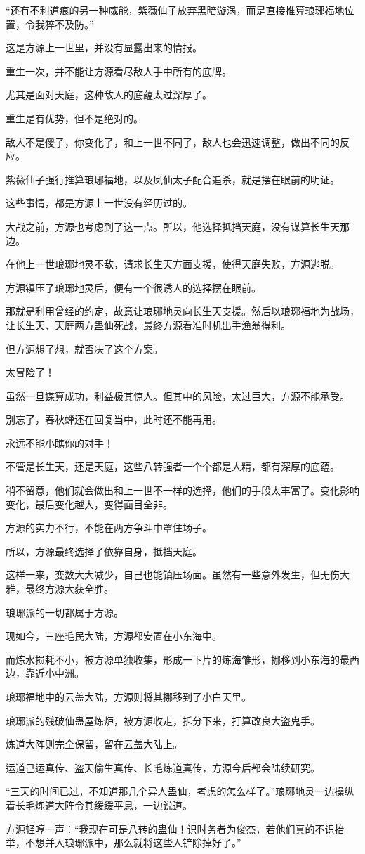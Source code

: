 \begin{this_body}
“还有不利道痕的另一种威能，紫薇仙子放弃黑暗漩涡，而是直接推算琅琊福地位置，令我猝不及防。”

这是方源上一世里，并没有显露出来的情报。

重生一次，并不能让方源看尽敌人手中所有的底牌。

尤其是面对天庭，这种敌人的底蕴太过深厚了。

重生是有优势，但不是绝对的。

敌人不是傻子，你变化了，和上一世不同了，敌人也会迅速调整，做出不同的反应。

紫薇仙子强行推算琅琊福地，以及凤仙太子配合追杀，就是摆在眼前的明证。

这些事情，都是方源上一世没有经历过的。

大战之前，方源也考虑到了这一点。所以，他选择抵挡天庭，没有谋算长生天那边。

在他上一世琅琊地灵不敌，请求长生天方面支援，使得天庭失败，方源逃脱。

方源镇压了琅琊地灵后，便有一个很诱人的选择摆在眼前。

那就是利用曾经的约定，故意让琅琊地灵向长生天支援。然后以琅琊福地为战场，让长生天、天庭两方蛊仙死战，最终方源看准时机出手渔翁得利。

但方源想了想，就否决了这个方案。

太冒险了！

虽然一旦谋算成功，利益极其惊人。但其中的风险，太过巨大，方源不能承受。

别忘了，春秋蝉还在回复当中，此时还不能再用。

永远不能小瞧你的对手！

不管是长生天，还是天庭，这些八转强者一个个都是人精，都有深厚的底蕴。

稍不留意，他们就会做出和上一世不一样的选择，他们的手段太丰富了。变化影响变化，最后变化越大，变得面目全非。

方源的实力不行，不能在两方争斗中罩住场子。

所以，方源最终选择了依靠自身，抵挡天庭。

这样一来，变数大大减少，自己也能镇压场面。虽然有一些意外发生，但无伤大雅，最终方源大获全胜。

琅琊派的一切都属于方源。

现如今，三座毛民大陆，方源都安置在小东海中。

而炼水损耗不小，被方源单独收集，形成一下片的炼海雏形，挪移到小东海的最西边，靠近小中洲。

琅琊福地中的云盖大陆，方源则将其挪移到了小白天里。

琅琊派的残破仙蛊屋炼炉，被方源收走，拆分下来，打算改良大盗鬼手。

炼道大阵则完全保留，留在云盖大陆上。

运道己运真传、盗天偷生真传、长毛炼道真传，方源今后都会陆续研究。

“三天的时间已过，不知道那几个异人蛊仙，考虑的怎么样了。”琅琊地灵一边操纵着长毛炼道大阵令其缓缓平息，一边说道。

方源轻哼一声：“我现在可是八转的蛊仙！识时务者为俊杰，若他们真的不识抬举，不想并入琅琊派中，那么就将这些人铲除掉好了。”

\end{this_body}

